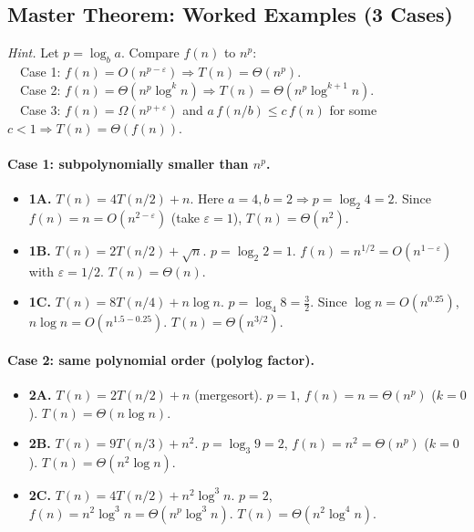 \documentclass[9pt]{extarticle}
\begin{document}
    \subsection*{Master Theorem: Worked Examples (3 Cases)}
    \textit{Hint.} Let \(p=\log_b a\). Compare \(f(n)\) to \(n^p\):\\
    \(\quad\)Case 1: \(f(n)=O(n^{p-\varepsilon}) \Rightarrow T(n)=\Theta(n^p)\).\\
    \(\quad\)Case 2: \(f(n)=\Theta(n^p\log^k n) \Rightarrow T(n)=\Theta(n^p\log^{k+1}n)\).\\
    \(\quad\)Case 3: \(f(n)=\Omega(n^{p+\varepsilon})\) and \(a\,f(n/b)\le c\,f(n)\) for some \(c<1 \Rightarrow T(n)=\Theta(f(n))\).
    
    \paragraph{Case 1: subpolynomially smaller than \(n^p\).}
    \begin{itemize}
      \item \textbf{1A.} \(T(n)=4T(n/2)+n\). Here \(a=4,b=2\Rightarrow p=\log_2 4=2\). Since \(f(n)=n=O(n^{2-\varepsilon})\) (take \(\varepsilon=1\)), \(\boxed{T(n)=\Theta(n^2)}\).
      \item \textbf{1B.} \(T(n)=2T(n/2)+\sqrt{n}\). \(p=\log_2 2=1\). \(f(n)=n^{1/2}=O(n^{1-\varepsilon})\) with \(\varepsilon=1/2\). \(\boxed{T(n)=\Theta(n)}\).
      \item \textbf{1C.} \(T(n)=8T(n/4)+n\log n\). \(p=\log_4 8=\tfrac{3}{2}\). Since \(\log n=O(n^{0.25})\), \(n\log n=O(n^{1.5-0.25})\). \(\boxed{T(n)=\Theta(n^{3/2})}\).
    \end{itemize}
    
    \paragraph{Case 2: same polynomial order (polylog factor).}
    \begin{itemize}
      \item \textbf{2A.} \(T(n)=2T(n/2)+n\) (mergesort). \(p=1\), \(f(n)=n=\Theta(n^p)\) (\(k=0\)). \(\boxed{T(n)=\Theta(n\log n)}\).
      \item \textbf{2B.} \(T(n)=9T(n/3)+n^2\). \(p=\log_3 9=2\), \(f(n)=n^2=\Theta(n^p)\) (\(k=0\)). \(\boxed{T(n)=\Theta(n^2\log n)}\).
      \item \textbf{2C.} \(T(n)=4T(n/2)+n^2\log^3 n\). \(p=2\), \(f(n)=n^2\log^3 n=\Theta(n^p\log^3 n)\). \(\boxed{T(n)=\Theta(n^2\log^4 n)}\).
    \end{itemize}
    
\end{document}
